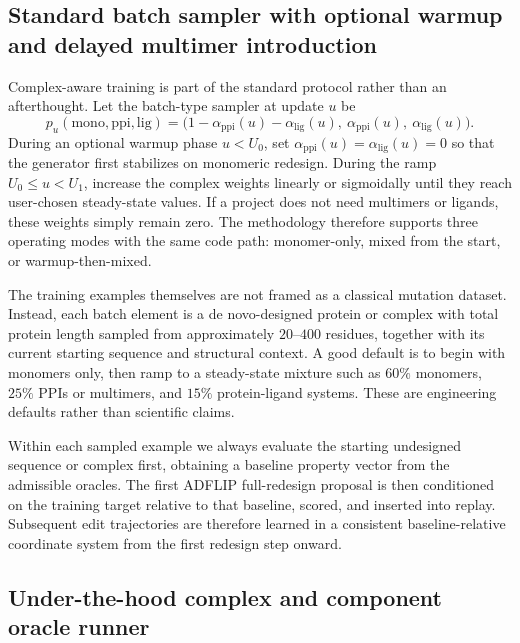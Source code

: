 \documentclass[11pt]{article}
\begin{document}
\subsection{Standard batch sampler with optional warmup and delayed multimer introduction}

Complex-aware training is part of the standard protocol rather than an afterthought. Let the batch-type sampler at update $u$ be
\begin{equation}
    p_u(\mathrm{mono},\mathrm{ppi},\mathrm{lig}) = \big(1-\alpha_{\mathrm{ppi}}(u)-\alpha_{\mathrm{lig}}(u),\ \alpha_{\mathrm{ppi}}(u),\ \alpha_{\mathrm{lig}}(u)\big).
\end{equation}
During an optional warmup phase $u<U_0$, set $\alpha_{\mathrm{ppi}}(u)=\alpha_{\mathrm{lig}}(u)=0$ so that the generator first stabilizes on monomeric redesign. During the ramp $U_0\le u < U_1$, increase the complex weights linearly or sigmoidally until they reach user-chosen steady-state values. If a project does not need multimers or ligands, these weights simply remain zero. The methodology therefore supports three operating modes with the same code path: monomer-only, mixed from the start, or warmup-then-mixed.

The training examples themselves are not framed as a classical mutation dataset. Instead, each batch element is a de novo-designed protein or complex with total protein length sampled from approximately $20$--$400$ residues, together with its current starting sequence and structural context. A good default is to begin with monomers only, then ramp to a steady-state mixture such as $60\%$ monomers, $25\%$ PPIs or multimers, and $15\%$ protein-ligand systems. These are engineering defaults rather than scientific claims.

Within each sampled example we always evaluate the starting undesigned sequence or complex first, obtaining a baseline property vector from the admissible oracles. The first ADFLIP full-redesign proposal is then conditioned on the training target relative to that baseline, scored, and inserted into replay. Subsequent edit trajectories are therefore learned in a consistent baseline-relative coordinate system from the first redesign step onward.



\subsection{Under-the-hood complex and component oracle runner}
\end{document}
